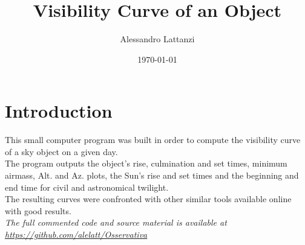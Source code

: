 \documentclass[a4paper]{article}
\title{Visibility Curve of an Object}
\author{Alessandro Lattanzi}
\date{\today}
\begin{document}
\maketitle
	
	\section{Introduction}
		This small computer program was built in order to compute the visibility curve of a sky object on a given day.\\
		The program outputs the object's rise, culmination and set times, minimum airmass, Alt. and Az. plots, the Sun's rise and set times and the beginning and end time for civil and astronomical twilight.\\
		The resulting curves were confronted with other similar tools available online with good results.\\
		\newline
		\textit{The full commented code and source material is available at \url{https://github.com/alelatt/Osservativa}}
		
	\vspace{0.035\textheight}
	
\end{document}
